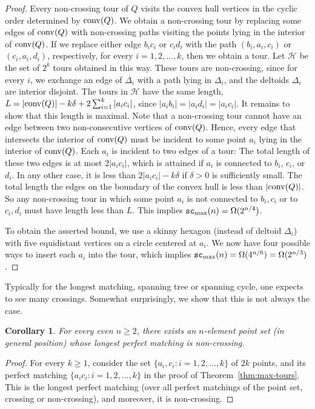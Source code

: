 \documentclass[11pt]{article}
\newtheorem{corollary}{Corollary}
\newcommand{\conv}{{\rm conv}}
\def\H{\mathcal H}
\def\sc{{\tt sc}}
\begin{document}
\begin{proof}
Every non-crossing tour of $Q$ visits the convex hull vertices in the cyclic order
determined by $\conv(Q)$. We obtain a non-crossing tour by replacing
some edges of $\conv(Q)$ with non-crossing paths visiting the points
lying in the interior of $\conv(Q)$. If we replace either edge $b_ic_i$ or
$c_id_i$ with the path $(b_i,a_i,c_i)$ or $(c_i,a_i,d_i)$, respectively,
for every $i=1,2,\ldots , k$, then we obtain a tour. Let $\H$ be
the set of $2^k$ tours obtained in this way. These tours are
non-crossing, since for every $i$, we exchange an edge of
$\Delta_i$ with a path lying in $\Delta_i$, and the deltoids
$\Delta_i$ are interior disjoint. The tours in $\H$ have the
same length, $L=|\conv(Q)|-k\delta+2\sum_{i=1}^k|a_ic_i|$,
since $|a_ib_i|=|a_id_i|=|a_ic_i|$. It remains to show that this length
is maximal. Note that a non-crossing tour cannot have an edge between two
non-consecutive vertices of $\conv(Q)$. Hence, every edge that
intersects the interior of $\conv(Q)$ must be incident to some point
$a_i$ lying in the interior of $\conv(Q)$. Each $a_i$ is incident to two
edges of a tour: The total length of these two edges is at most $2|a_ic_i|$,
which is attained if $a_i$ is connected to $b_i$, $c_i$, or $d_i$.
In any other case, it is less than $2|a_ic_i|-k\delta$ if $\delta>0$ is
sufficiently small. The total length the edges on the boundary of the
convex hull is less than $|\conv(Q)|$. So any non-crossing tour in
which some point $a_i$ is not connected to $b_i, c_i$ or to $c_i,d_i$
must have length less than $L$. This implies $\sc_{\rm max}(n) = \Omega(2^{n/4})$.

To obtain the asserted bound, we use a skinny hexagon (instead of deltoid $\Delta_i$)
with five equidistant vertices on a circle centered at $a_i$.
We now have four possible ways to insert each $a_i$ into the tour, which implies
$\sc_{\rm max}(n) = \Omega(4^{n/6}) = \Omega(2^{n/3})$.
\end{proof}

Typically for the longest matching, spanning tree or spanning
cycle, one expects to see many crossings. Somewhat surprisingly, we
show that this is not always the case.

\begin{corollary} \label{cor:noncrossing}
For every even $n \geq 2$, there exists an $n$-element point set (in
general position) whose longest perfect matching is non-crossing.
\end{corollary}
\begin{proof}
For every $k \geq 1$, consider the set $\{ a_i, c_i : i=1,2,\ldots ,k \}$
of $2k$ points, and its perfect matching $\{a_ic_i: i=1,2,\ldots , k\}$
in the proof of Theorem~\ref{thm:max-tours}. This is the longest perfect
matching (over all perfect matchings of the point set, crossing or non-crossing),
and moreover, it is non-crossing.
\end{proof}
\end{document}
